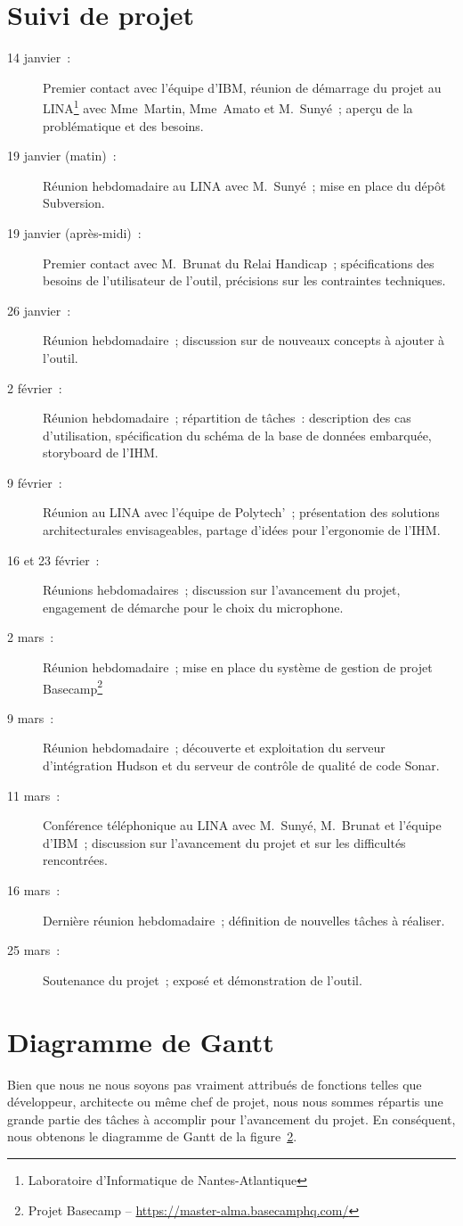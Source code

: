 \appendix

\chapter{Suivi de projet}

\begin{description}
\item[14 janvier~:] Premier contact avec l'équipe d'IBM, réunion de démarrage du projet au LINA\footnote{Laboratoire d'Informatique de Nantes-Atlantique} avec Mme~Martin, Mme~Amato et M.~Sunyé~; aperçu de la problématique et des besoins.
\item[19 janvier (matin)~:] Réunion hebdomadaire au LINA avec M.~Sunyé~; mise en place du dépôt Subversion.
\item[19 janvier (après-midi)~:] Premier contact avec M.~Brunat du Relai Handicap~; spécifications des besoins de l'utilisateur de l'outil, précisions sur les contraintes techniques.
\item[26 janvier~:] Réunion hebdomadaire~; discussion sur de nouveaux concepts à ajouter à l'outil.
\item[2 février~:] Réunion hebdomadaire~; répartition de tâches~: description des cas d'utilisation, spécification du schéma de la base de données embarquée, storyboard de l'IHM.
\item[9 février~:] Réunion au LINA avec l'équipe de Polytech'~; présentation des solutions architecturales envisageables, partage d'idées pour l'ergonomie de l'IHM.
\item[16 et 23 février~:] Réunions hebdomadaires~; discussion sur l'avancement du projet, engagement de démarche pour le choix du microphone.
\item[2 mars~:] Réunion hebdomadaire~; mise en place du système de gestion de projet Basecamp\footnote{Projet Basecamp -- \url{https://master-alma.basecamphq.com/}}
\item[9 mars~:] Réunion hebdomadaire~; découverte et exploitation du serveur d'intégration Hudson et du serveur de contrôle de qualité de code Sonar.
\item[11 mars~:] Conférence téléphonique au LINA avec M.~Sunyé, M.~Brunat et l'équipe d'IBM~; discussion sur l'avancement du projet et sur les difficultés rencontrées.
\item[16 mars~:] Dernière réunion hebdomadaire~; définition de nouvelles tâches à réaliser.
\item[25 mars~:] Soutenance du projet~; exposé et démonstration de l'outil.
\end{description}


\chapter{Diagramme de Gantt}

Bien que nous ne nous soyons pas vraiment attribués de fonctions telles que développeur, architecte ou même chef de projet, nous nous sommes répartis une grande partie des tâches à accomplir pour l'avancement du projet.
En conséquent, nous obtenons le diagramme de Gantt de la figure~\ref{}. %


\printindex
